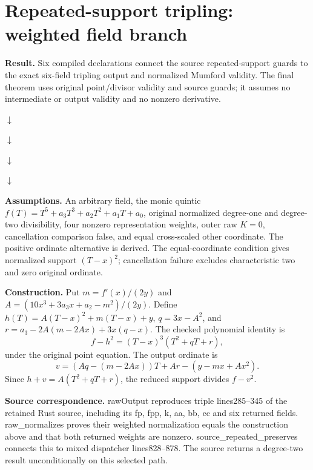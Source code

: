 \documentclass[10pt]{article}
\begin{document}
\section*{Repeated-support tripling: weighted field branch}
\textbf{Result.} Six compiled declarations connect the source repeated-support guards to the exact six-field tripling output and normalized Mumford validity. The final theorem uses original point/divisor validity and source guards; it assumes no intermediate or output validity and no nonzero derivative.

\begin{center}\par $\downarrow$\par
{}\par $\downarrow$\par
{}\par $\downarrow$\par
{}\par $\downarrow$\par
{}\end{center}

\textbf{Assumptions.} An arbitrary field, the monic quintic $f(T)=T^5+a_3T^3+a_2T^2+a_1T+a_0$, original normalized degree-one and degree-two divisibility, four nonzero representation weights, outer raw $K=0$, cancellation comparison false, and equal cross-scaled other coordinate. The positive ordinate alternative is derived. The equal-coordinate condition gives normalized support $(T-x)^2$; cancellation failure excludes characteristic two and zero original ordinate.

\textbf{Construction.} Put $m=f'(x)/(2y)$ and $A=(10x^3+3a_3x+a_2-m^2)/(2y)$. Define $h(T)=A(T-x)^2+m(T-x)+y$, $q=3x-A^2$, and $r=a_3-2A(m-2Ax)+3x(q-x)$. The checked polynomial identity is
\[f-h^2=(T-x)^3(T^2+qT+r),\]
under the original point equation. The output ordinate is
\[v=(Aq-(m-2Ax))T+Ar-(y-mx+Ax^2).\]
Since $h+v=A(T^2+qT+r)$, the reduced support divides $f-v^2$.

\textbf{Source correspondence.} rawOutput reproduces triple lines285--345 of the retained Rust source, including its fp, fpp, k, aa, bb, cc and six returned fields. raw\_normalizes proves their weighted normalization equals the construction above and that both returned weights are nonzero. source\_repeated\_preserves connects this to mixed dispatcher lines828--878. The source returns a degree-two result unconditionally on this selected path.
\end{document}

